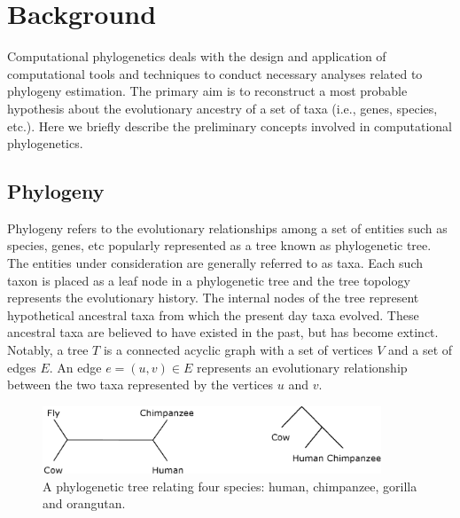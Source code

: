 \chapter{Background}
\label{ch:background}



\graphicspath{{snoga/}}
Computational phylogenetics deals with the design and application of computational tools and techniques to conduct necessary analyses related to phylogeny estimation. The primary aim is to reconstruct a most probable hypothesis about the evolutionary ancestry of a set of taxa (i.e., genes, species, etc.). Here we briefly describe the preliminary concepts involved in computational phylogenetics. 
\section{Phylogeny}
Phylogeny refers to the evolutionary relationships among a set of entities such as species, genes, etc popularly represented as a tree known as phylogenetic tree. The entities under consideration are generally referred to as taxa. Each such taxon is placed as a leaf node in a phylogenetic tree and the tree topology represents the evolutionary history. The  internal nodes of the tree represent hypothetical ancestral taxa from which the present day taxa evolved. These ancestral taxa are believed to have existed in the past, but has become extinct. Notably, a tree $T$ is a connected acyclic graph with a set of vertices $V$ and a set of edges $E$. An edge $e = (u, v) \in E$ represents an evolutionary relationship between the two taxa represented by the vertices $u$ and $v$. 

\begin{figure}[!htbp]
\centering
\includegraphics[width=0.9\textwidth]{Figure/outgroup.eps}
\caption{A phylogenetic tree relating four species: human, chimpanzee, gorilla and orangutan. }
\label{fig:outgroup}
\end{figure}

